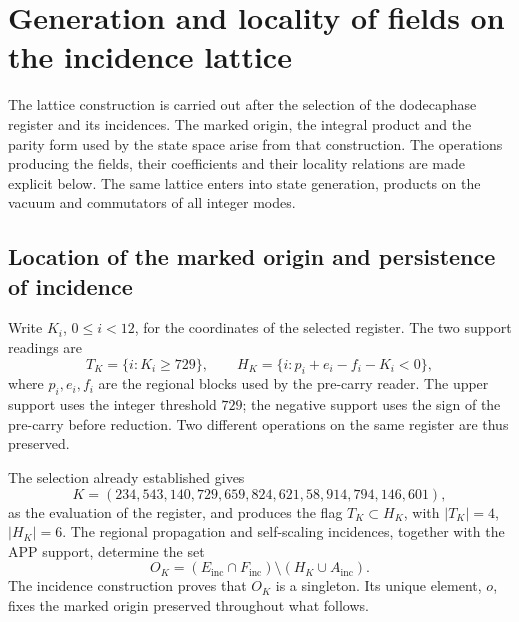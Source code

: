 \section[Fields on the incidence lattice]{Generation and locality of fields on the incidence lattice}
\label{sec:df-campos-reticulares}

The lattice construction is carried out after the selection of the dodecaphase register and its incidences. The marked origin, the integral product and the parity form used by the state space arise from that construction. The operations producing the fields, their coefficients and their locality relations are made explicit below. The same lattice enters into state generation, products on the vacuum and commutators of all integer modes.

\subsection{Location of the marked origin and persistence of incidence}


Write \(K_i\), \(0\leq i<12\), for the coordinates of the selected register. The two support readings are
\begin{equation}
 T_K=\{i:K_i\geq729\},\qquad
 H_K=\{i:p_i+e_i-f_i-K_i<0\},
 \label{eq:df-soportes-K}
\end{equation}
where \(p_i,e_i,f_i\) are the regional blocks used by the pre-carry reader. The upper support uses the integer threshold \(729\); the negative support uses the sign of the pre-carry before reduction. Two different operations on the same register are thus preserved.

The selection already established gives
\[
 K=(234,543,140,729,659,824,621,58,914,794,146,601),
\]
as the evaluation of the register, and produces the flag \(T_K\subset H_K\), with \(|T_K|=4\), \(|H_K|=6\). The regional propagation and self-scaling incidences, together with the APP support, determine the set
\[
 O_K=(E_{\mathrm{inc}}\cap F_{\mathrm{inc}})
       \setminus(H_K\cup A_{\mathrm{inc}}).
\]
The incidence construction proves that \(O_K\) is a singleton. Its unique element, \(o\), fixes the marked origin preserved throughout what follows.

